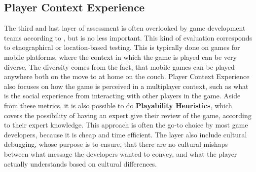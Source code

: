 \subsection{Player Context Experience}
The third and last layer of assessment is often overlooked by game development teams according to \cite{gxmethod}, but is no less important.
This kind of evaluation corresponds to etnographical or location-based testing.
This is typically done on games for mobile platforms, where the context in which the game is played can be very diverse.
The diversity comes from the fact, that mobile games can be played anywhere both on the move to at home on the couch.
Player Context Experience also focuses on how the game is perceived in a multiplayer context, such as what is the social experience from interacting with other players in the game.
Aside from these metrics, it is also possible to do \textbf{Playability Heuristics}, which covers the possibility of having an expert give their review of the game, according to their expert knowledge.
This approach is often the go-to choice by most game developers, because it is cheap and time efficient\cite{gxmethod}.
The layer also include cultural debugging, whose purpose is to ensure, that there are no cultural mishaps between what message the developers wanted to convey, and what the player actually understands based on cultural differences.
